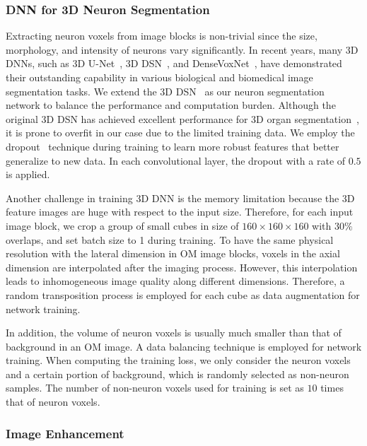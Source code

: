  

\subsubsection{DNN for 3D Neuron Segmentation}
\label{sec:network}
 
Extracting neuron voxels from image blocks is non-trivial since the size, morphology, and intensity of neurons vary significantly.
In recent years, many 3D DNNs, such as 3D U-Net~\cite{Cicek2016}, 3D DSN~\cite{Dou2017}, and DenseVoxNet~\cite{Yu2017}, have demonstrated their outstanding capability in various biological and biomedical image segmentation tasks.
%
We extend the 3D DSN~\cite{Dou2017} as our neuron segmentation network to balance the performance and computation burden.
%
Although the original 3D DSN has achieved excellent performance for 3D organ segmentation~\cite{Dou2017}, it is prone to overfit in our case due to the limited training data. 
We employ the dropout~\cite{Srivastava2014} technique during training to learn more robust features that better generalize to new data.
In each convolutional layer, the dropout with a rate of $0.5$ is applied.%


Another challenge in training 3D DNN is the memory limitation because the 3D feature images are huge with respect to the input size. Therefore, for each input image block, we crop a group of small cubes in size of $160\times 160\times 160$ with $30\%$ overlaps, and set batch size to 1 during training. 
%
To have the same physical resolution with the lateral dimension in OM image blocks, voxels in the axial dimension are interpolated after the imaging process. However, this interpolation leads to inhomogeneous image quality along different dimensions. 
Therefore, a random transposition process is employed for each cube as data augmentation for network training.


In addition, the volume of neuron voxels is usually much smaller than that of background in an OM image.
A data balancing technique is employed for network training.
When computing the training loss, we only consider the neuron voxels and a certain portion of background, which is randomly selected as non-neuron samples.
The number of non-neuron voxels used for training is set as $10$ times that of neuron voxels.


\subsubsection{Image Enhancement}
\label{sec:enhancement}

